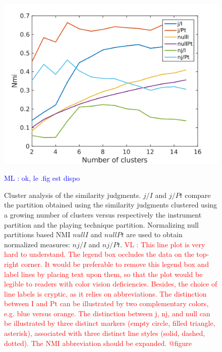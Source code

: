 \documentclass{article}
\makeatletter
\newcommand*{\eg}{e.g.\@\xspace}
\newcommand{\ml}[1]{\textcolor{blue}{ML : #1}}
\newcommand{\vl}[1]{\textcolor{red}{VL : #1}}
\makeatother
\begin{document}
\begin{figure}
\center
\includegraphics[width = \textwidth]{figures/clusterAnalysis.png}
\caption{Cluster analysis of the similarity judgments. $j/I$ and $j/Pt$ compare the partition obtained using the similarity judgments clustered using a growing number of clusters versus respectively the instrument partition and the playing technique partition. Normalizing null partitions based NMI $nullI$ and $nullPt$ are used to obtain normalized measures: $nj/I$ and $nj/Pt$.
\vl{This line plot is very hard to understand.
The legend box occludes the data on the top-right corner.
It would be preferable to remove this legend box and label lines
by placing text upon them,
so that the plot would be legible to readers with color vision deficiencies.
Besides, the choice of line labels is cryptic, as it relies on abbreviations.
The distinction between I and Pt
can be illustrated by two complementary colors, \eg{} blue versus orange.
The distinction between j, nj, and null
can be illustrated by three distinct markers
(empty circle, filled triangle, asterisk),
associated with
three distinct line styles (solid, dashed, dotted).
The NMI abbreviation should be expanded.
@figure}}
\ml{ok, le .fig est dispo}
\label{fig:clusters}
\end{figure}
\end{document}
